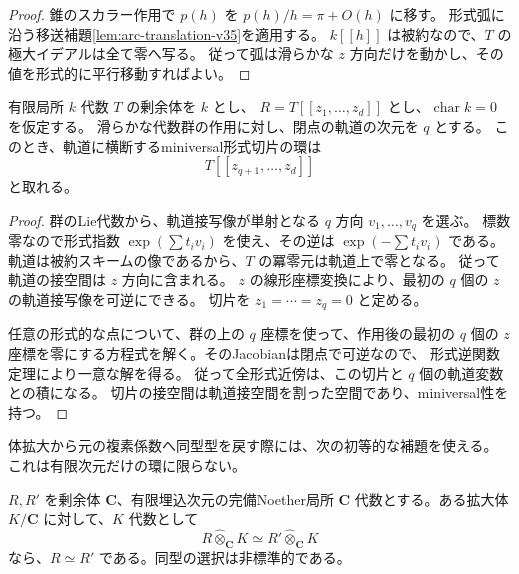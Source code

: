 \begin{proof}
錐のスカラー作用で $p(h)$ を $p(h)/h=\pi+O(h)$ に移す。
形式弧に沿う移送補題\ref{lem:arc-translation-v35}を適用する。
$k[[h]]$ は被約なので、$T$ の極大イデアルは全て零へ写る。
従って弧は滑らかな $z$ 方向だけを動かし、その値を形式的に平行移動すればよい。
\end{proof}

\begin{lemma}[滑らかな軌道方向だけを除く切片]
\label{lem:artin-orbit-slice-v37}
有限局所 $k$ 代数 $T$ の剰余体を $k$ とし、
$R=T[[z_1,\ldots,z_d]]$ とし、$\operatorname{char}k=0$ を仮定する。
滑らかな代数群の作用に対し、閉点の軌道の次元を $q$ とする。
このとき、軌道に横断するminiversal形式切片の環は
\[
 T[[z_{q+1},\ldots,z_d]]
\]
と取れる。
\end{lemma}

\begin{proof}
群のLie代数から、軌道接写像が単射となる $q$ 方向 $v_1,\ldots,v_q$ を選ぶ。
標数零なので形式指数 $\exp(\sum t_iv_i)$ を使え、その逆は $\exp(-\sum t_iv_i)$ である。
軌道は被約スキームの像であるから、$T$ の冪零元は軌道上で零となる。
従って軌道の接空間は $z$ 方向に含まれる。
$z$ の線形座標変換により、最初の $q$ 個の $z$ の軌道接写像を可逆にできる。
切片を $z_1=\cdots=z_q=0$ と定める。

任意の形式的な点について、群の上の $q$ 座標を使って、作用後の最初の $q$ 個の
$z$ 座標を零にする方程式を解く。そのJacobianは閉点で可逆なので、
形式逆関数定理により一意な解を得る。
従って全形式近傍は、この切片と $q$ 個の軌道変数との積になる。
切片の接空間は軌道接空間を割った空間であり、miniversal性を持つ。
\end{proof}

体拡大から元の複素係数へ同型型を戻す際には、次の初等的な補題を使える。
これは有限次元だけの環に限らない。

\begin{lemma}[複素係数の形式同型の下降]
\label{lem:complex-formal-descent-v37}
$R,R'$ を剰余体 $\mathbf C$、有限埋込次元の完備Noether局所
$\mathbf C$ 代数とする。ある拡大体 $K/\mathbf C$ に対して、$K$ 代数として
\[
 R\widehat\otimes_{\mathbf C}K
 \simeq R'\widehat\otimes_{\mathbf C}K
\]
なら、$R\simeq R'$ である。同型の選択は非標準的である。
\end{lemma}

